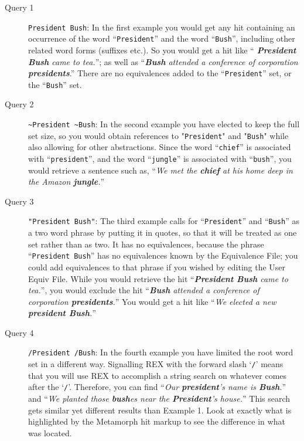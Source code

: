 \begin{description}

\item[Query 1] \verb`President Bush`:  In the first example you
would get any hit containing an occurrence of the word
``\verb`President`'' and the word ``\verb`Bush`'', including other
related word forms (suffixes etc.).  So you would get a hit like ``{\em {\bf
President} {\bf Bush} came to tea.}''; as well as ``{\em {\bf Bush}
attended a conference of corporation {\bf presidents}}.''  There are
no equivalences added to the ``\verb`President`'' set, or the
``\verb`Bush`'' set.

\item[Query 2] \verb`~President ~Bush`:  In the second example you have
elected to keep the full set size, so you would obtain references to
"\verb`President`" and "\verb`Bush`" while also allowing for other
abstractions.  Since the word ``\verb`chief`'' is associated with
``\verb`president`'', and the word ``\verb`jungle`'' is associated
with ``\verb`bush`'', you would retrieve a sentence such as, ``{\em We
met the {\bf chief} at his home deep in the Amazon {\bf jungle}.}''

\item[Query 3] \verb`"President Bush"`:  The third example calls for
``\verb`President`'' and ``\verb`Bush`'' as a two word phrase by
putting it in quotes, so that it will be treated as one set rather
than as two.  It has no equivalences, because the phrase
``\verb`President Bush`'' has no equivalences known by the Equivalence
File; you could add equivalences to that phrase if you wished by
editing the User Equiv File.  While you would retrieve the hit
``{\em {\bf President Bush} came to tea.}'', you would exclude the hit
``{\em {\bf Bush} attended a conference of corporation {\bf
presidents}.}'' You would get a hit like ``{\em We elected a new {\bf
president Bush}.}''

\item[Query 4] \verb`/President /Bush`:  In the fourth example you
have limited the root word set in a different way.  Signalling
REX with the forward slash `\verb`/`' means that you will use
REX to accomplish a string search on whatever comes after the
`\verb`/`'.  Therefore, you can find ``{\em Our {\bf president}'s name
is {\bf Bush}.}'' and ``{\em We planted those {\bf bush}es near the
{\bf President}'s house.}'' This search gets similar yet different
results than Example 1. Look at exactly what is highlighted by the
Metamorph hit markup to see the difference in what was located.


\end{description}
